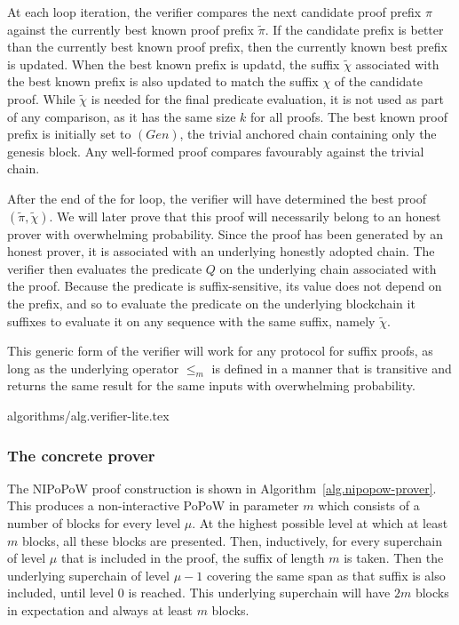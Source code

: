 At each loop iteration, the verifier compares the next candidate proof prefix
$\pi$ against the currently best known proof prefix $\tilde\pi$. If the
candidate prefix is better than the currently best known proof prefix, then the
currently known best prefix is updated.  When the best known prefix is updatd,
the suffix $\tilde\chi$ associated with the best known prefix is also updated to
match the suffix $\chi$ of the candidate proof. While $\tilde\chi$ is needed for
the final predicate evaluation, it is not used as part of any comparison, as it
has the same size $k$ for all proofs. The best known proof prefix is initially
set to $(Gen)$, the trivial anchored chain containing only the genesis block.
Any well-formed proof compares favourably against the trivial chain.

After the end of the for loop, the verifier will have determined the best proof
$(\tilde\pi, \tilde\chi)$. We will later prove that this proof will necessarily
belong to an honest prover with overwhelming probability. Since the proof has
been generated by an honest prover, it is associated with an underlying honestly
adopted chain. The verifier then evaluates the predicate $Q$ on the underlying
chain associated with the proof. Because the predicate is suffix-sensitive, its
value does not depend on the prefix, and so to evaluate the predicate on the
underlying blockchain it suffixes to evaluate it on any sequence with the same
suffix, namely $\tilde\chi$.

This generic form of the verifier will work for any protocol for suffix proofs,
as long as the underlying operator $\leq_m$ is defined in a manner that is
transitive and returns the same result for the same inputs with overwhelming
probability.

{algorithms/alg.verifier-lite.tex}

\subsubsection{The concrete prover}

The NIPoPoW proof construction is shown in Algorithm~\ref{alg.nipopow-prover}.
This produces a non-interactive PoPoW in parameter $m$ which consists of a
number of blocks for every level $\mu$. At the highest possible level at which
at least $m$ blocks, all these blocks are presented. Then, inductively, for
every superchain of level $\mu$ that is included in the proof, the suffix of
length $m$ is taken. Then the underlying superchain of level $\mu - 1$ covering
the same span as that suffix is also included, until level $0$ is reached. This
underlying superchain will have $2m$ blocks in expectation and always at least
$m$ blocks.

